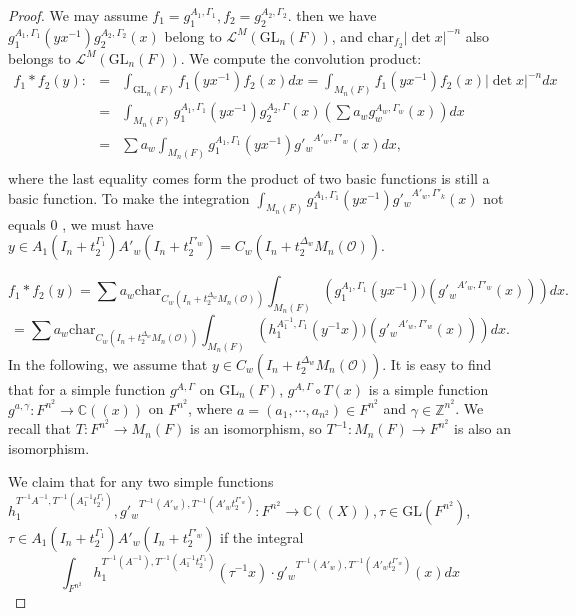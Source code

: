 \documentclass{amsart}
\theoremstyle{definition}
\theoremstyle{remark}
\numberwithin{equation}{section}
\def  \Char     {\mathrm{char}}
\def  \GL        {\mathrm{GL}}
\def  \cl       {\mathcal{L}}
\def  \co       {\mathcal{O}}
\def  \bc       {\mathbb{C}}
\def  \bz       {\mathbb{Z}}
\begin{document}
\begin{proof}
 We may assume $f_1 = g_1^{A_1 , \Gamma_1}  , f_2 = g_2^{A_2, \Gamma_2}$.
  then we  have $	g_1^{A_1 , \Gamma_1}  (y x^{-1}) g_2^{A_2 , \Gamma_2}  (x) $ belong to $\cl^M(\GL_n(F))$, and $\Char_{f_2}|\det x|^{-n}$  also belongs to  $\cl^{M}(\GL_n(F))$.   We  compute the convolution product:
  \begin{eqnarray*}
  	f_1* f_2(y):&=& \int_{\GL_n(F)} f_1(yx^{-1}) f_2(x) dx=   \int_{M_n(F)}   f_1(yx^{-1})  f_2(x) |\det x|^{-n}  dx   \\
             &=&   \int_{ M_n(F)} g_1^{A_1, \Gamma_1}  (yx^{-1}) g_2^{A_2, \Gamma} (x) \left( \sum a_w g_w^{A_w, \Gamma_w}(x) \right)  dx  \\ 
         &=&   \sum a_w \int_{ M_n(F)} g_1^{A_1, \Gamma_1}(yx^{-1} ){g'_{w}}^{A'_w, \Gamma'_w}  ( x) dx,  \\ 
 \end{eqnarray*}
 where the last equality comes form    the product of two  basic functions is still a basic function.
  To make  the integration $ \int_{ M_n(F)}  g_1^{A_1, \Gamma_1}(yx^{-1} ){g'_{w}}^{A'_w, \Gamma'_k}  ( x)$ not equals $0$ , we must have $ y \in  A_1(I_n+ t_2^{\Gamma_1}) A'_w(I_n+ t_2^{\Gamma'_w} )= C_w(I_n+t_2 ^{\Delta_w}M_n(\co))$. 

 \[
  	f_1* f_2(y) = \sum a_w  \Char_{ C_w(I_n+t_2 ^{\Delta_w}M_n(\co))}\int_{M_n(F)}  \left(   g_1^{A_1, \Gamma_1}(yx^{-1}))  (  {g'_{w}}^{A'_w, \Gamma'_w} (x)) \right)   dx .
\]
 \[
= \sum a_w  \Char_{ C_w(I_n+t_2 ^{\Delta_w}M_n(\co))}\int_{M_n(F)}  \left(   h_1^{A^{-1}_1, \Gamma_1}(y^{-1}x))  (  {g'_{w}}^{A'_w, \Gamma'_w} (x)) \right)   dx .
\]
    In the following, we assume that  $y \in  C_w(I_n+t_2 ^{\Delta_w}M_n(\co))$.  It is easy to  find  that   for a simple function $g^{A,\Gamma}$ on $\GL_n(F)$, $g^{A, \Gamma} \circ T(x)$  is  a simple function  $g^{a, \gamma}: F^{n^2} \to \bc((x))$ on $F^{n^2}$, where $a=(a_1, \cdots, a_{n^2}) \in F^{n^2}$ and $\gamma \in \bz^{n^2}$.  We recall that $T: F^{n^2} \to M_n(F)$ is an isomorphism, so $T^{-1}: M_n(F) \to F^{n^2}$ is also an isomorphism.
    
    We claim that for any two simple functions $h_1^{T^{-1}A^{-1},  T^{-1}(A^{-1}_1 t_2^{\Gamma_1})}, {g'_w}^{T^{-1}(A'_w) ,  T^{-1}( A'_w t_2^{\Gamma'_w})}: F^{n^2} \to \bc((X)),  \tau \in \GL(F^{n^2})$, $ \tau \in A_1(I_n+ t_2^{\Gamma_1}) A'_w(I_n+ t_2^{\Gamma'_w} )$  if the integral 
    $$\int_{F^{n^2}} h_1^{T^{-1}(A^{-1}),  T^{-1}(A^{-1}_1 t_2^{\Gamma_1})}(\tau^{-1}x)  \cdot{g'_w}^{T^{-1}(A'_w) ,  T^{-1} (A'_w t_2^{\Gamma'_w})}(x) dx
    $$
    

\end{proof}
\end{document}
